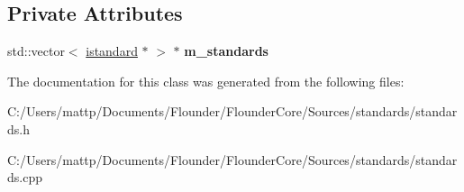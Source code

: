 \subsection*{Private Attributes}
\begin{DoxyCompactItemize}
\item 
\mbox{\label{classflounder_1_1standards_a022e3fe7bc232e076b6b2fe260f7cbde}} 
std\+::vector$<$ \hyperlink{classflounder_1_1istandard}{istandard} $\ast$ $>$ $\ast$ {\bfseries m\+\_\+standards}
\end{DoxyCompactItemize}


The documentation for this class was generated from the following files\+:\begin{DoxyCompactItemize}
\item 
C\+:/\+Users/mattp/\+Documents/\+Flounder/\+Flounder\+Core/\+Sources/standards/standards.\+h\item 
C\+:/\+Users/mattp/\+Documents/\+Flounder/\+Flounder\+Core/\+Sources/standards/standards.\+cpp\end{DoxyCompactItemize}
